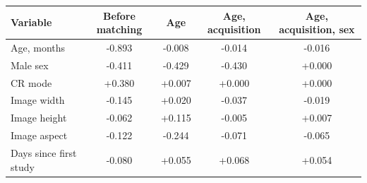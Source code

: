 \begin{tabular}{lcccc}
\toprule
Variable & Before matching & Age & Age, acquisition & Age, acquisition, sex \\
\midrule
Age, months & -0.893 & -0.008 & -0.014 & -0.016 \\
Male sex & -0.411 & -0.429 & -0.430 & +0.000 \\
CR mode & +0.380 & +0.007 & +0.000 & +0.000 \\
Image width & -0.145 & +0.020 & -0.037 & -0.019 \\
Image height & -0.062 & +0.115 & -0.005 & +0.007 \\
Image aspect & -0.122 & -0.244 & -0.071 & -0.065 \\
Days since first study & -0.080 & +0.055 & +0.068 & +0.054 \\
\bottomrule
\end{tabular}

